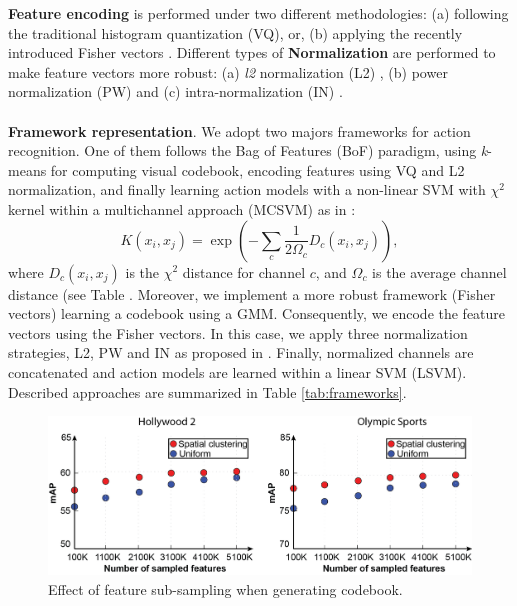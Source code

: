\textbf{Feature encoding} is performed under two different methodologies: (a) following the traditional histogram quantization (VQ), or, (b) applying the recently introduced Fisher vectors \cite{perronnin2010}. Different types of \textbf{Normalization} are performed to make feature vectors more robust: (a) \textit{l2} normalization (L2) \cite{perronnin2010}, (b) power normalization (PW) \cite{perronnin2010} and (c) intra-normalization (IN) \cite{xwang2013}. \\\\
\textbf{Framework representation}. We adopt two majors frameworks for action recognition. One of them follows the Bag of Features (BoF) paradigm, using \textit{k}-means for computing visual codebook, encoding features using VQ and L2 normalization, and finally learning action models with a non-linear SVM with $\chi^2$ kernel within a multichannel approach (MCSVM) as in \cite{zhang2007}:
\begin{equation}
K(x_i,x_j)= \exp(-\sum_c {\frac{1}{2\Omega_c} D_c(x_i,x_j)}),
\label{eq:multichannel}
\end{equation}
where $D_c(x_i,x_j)$ is the $\chi^2$ distance for channel $c$, and $\Omega_c$ is the average channel distance (see Table . Moreover, we implement a more robust framework (Fisher vectors) learning a codebook using a GMM. Consequently, we encode the feature vectors using the Fisher vectors. In this case, we apply three normalization strategies, L2, PW and IN as proposed in \cite{xwang2013}. Finally, normalized channels are concatenated and action models are learned within a linear SVM (LSVM). Described approaches are summarized in Table \ref{tab:frameworks}.

\begin{figure}[t!]
\begin{center}
\includegraphics[width=0.98\linewidth]{fig/sampling.png}
\end{center}
\caption{Effect of feature sub-sampling when generating codebook.}
\label{fig:feature_sampling}
\end{figure}

